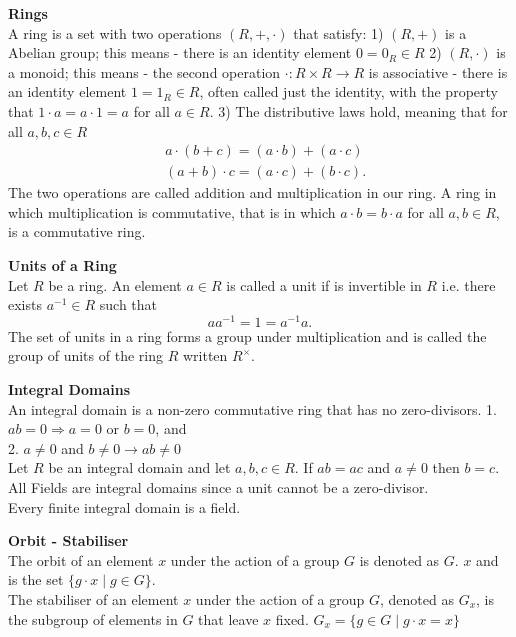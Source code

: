 \documentclass[a4paper, 10pt]{article}
\begin{document}
\begin{multicols*}{3}
\textbf{Rings}\\
A ring is a set with two operations $(R,+, \cdot)$ that satisfy:
1) $(R,+)$ is a Abelian group; this means
	- there is an identity element $0 = 0_{R}\in R$ 
2) $(R, \cdot)$ is a monoid; this means 
	-  the second operation $\cdot: R \times R \rightarrow R$ is associative 
	- there is an identity element $1=1_R \in R$, often called just the identity, with the property that $1 \cdot a=a \cdot 1=a$ for all $a \in R$.
3) The distributive laws hold, meaning that for all $a, b, c \in R$
\begin{align*}
& a \cdot(b+c)=(a \cdot b)+(a \cdot c) \\
& (a+b) \cdot c=(a \cdot c)+(b \cdot c) .
\end{align*}
The two operations are called addition and multiplication in our ring. A ring in which multiplication is commutative, that is in which $a \cdot b=b \cdot a$ for all $a, b \in R$, is a commutative ring.

\textbf{Units of a Ring}\\
Let $R$ be a ring. An element $a \in R$ is called a unit if is invertible in $R$ i.e. there exists $a^{-1} \in R$ such that
$$
a a^{-1}=1=a^{-1} a .
$$
The set of units in a ring forms a group under multiplication and is called the group of units of the ring $R$ written $R^\times$.

\textbf{Integral Domains}\\
An integral domain is a non-zero commutative ring that has no zero-divisors.
1. $a b=0 \Rightarrow a=0$ or $b=0$, and\\
2. $a \neq 0$ and $b \neq 0 \rightarrow a b \neq 0$\\
Let $R$ be an integral domain and let $a, b, c \in R$. If $a b=a c$ and $a \neq 0$ then $b=c$.
All Fields are integral domains since a unit cannot be a zero-divisor. \\
Every finite integral domain is a field.

\textbf{Orbit - Stabiliser}\\
The orbit of an element $x$ under the action of a group $G$ is denoted as $G$. $x$ and is the set $\{g \cdot x \mid g \in G\}$.\\
The stabiliser of an element $x$ under the action of a group $G$, denoted as $G_x$, is the subgroup of elements in $G$ that leave $x$ fixed. $G_x=\{g \in G \mid g \cdot x=x\}$


\end{multicols*}
\end{document}
